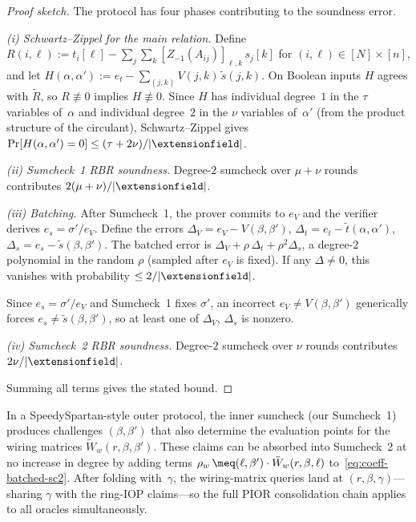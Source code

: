 \begin{proof}[Proof sketch]
The protocol has four phases contributing to the soundness error.

\emph{(i) Schwartz--Zippel for the main relation.}
Define $R(i,\ell) := t_i[\ell] - \sum_j \sum_k
[Z_{-1}(A_{ij})]_{\ell,k}\, s_j[k]$ for $(i,\ell) \in [N] \times [n]$,
and let
$H(\alpha,\alpha') := e_t - \sum_{(j,k)} V(j,k)\, \tilde{s}(j,k)$.
On Boolean inputs $H$ agrees with $\tilde{R}$, so $R \not\equiv 0$
implies $H \not\equiv 0$.  Since $H$ has individual degree~$1$ in
the $\tau$ variables of~$\alpha$ and individual degree~$2$ in
the $\nu$ variables of~$\alpha'$ (from the product structure of the
circulant), Schwartz--Zippel gives
$\Pr[H(\alpha,\alpha') = 0] \leq (\tau + 2\nu)/|\extensionfield|$.

\emph{(ii) Sumcheck~1 RBR soundness.}
Degree-$2$ sumcheck over $\mu + \nu$ rounds contributes
$2(\mu+\nu)/|\extensionfield|$.

\emph{(iii) Batching.}
After Sumcheck~1, the prover commits to $e_V$ and the verifier
derives $e_s = \sigma'/e_V$.  Define the errors
$\Delta_V = e_V - V(\beta,\beta')$,
$\Delta_t = e_t - \tilde{t}(\alpha,\alpha')$,
$\Delta_s = e_s - \tilde{s}(\beta,\beta')$.
The batched error is $\Delta_V + \rho\,\Delta_t + \rho^2\Delta_s$,
a degree-$2$ polynomial in the random $\rho$ (sampled after $e_V$
is fixed).  If any $\Delta \neq 0$, this vanishes with probability
$\leq 2/|\extensionfield|$.

Since $e_s = \sigma'/e_V$ and Sumcheck~1 fixes $\sigma'$,
an incorrect $e_V \neq V(\beta,\beta')$ generically forces
$e_s \neq \tilde{s}(\beta,\beta')$, so at least one of $\Delta_V$,
$\Delta_s$ is nonzero.

\emph{(iv) Sumcheck~2 RBR soundness.}
Degree-$2$ sumcheck over $\nu$ rounds contributes
$2\nu/|\extensionfield|$.

Summing all terms gives the stated bound.
\end{proof}


In a SpeedySpartan-style outer protocol, the inner sumcheck
(our Sumcheck~1) produces challenges $(\beta,\beta')$ that also
determine the evaluation points for the wiring matrices
$\tilde{W}_w(r,\beta,\beta')$.  These claims can be absorbed into
Sumcheck~2 at no increase in degree by adding terms
$\rho_w\, \meq(\ell,\beta') \cdot \tilde{W}_w(r,\beta,\ell)$
to~\eqref{eq:coeff-batched-sc2}.  After folding with~$\gamma$,
the wiring-matrix queries land at $(r,\beta,\gamma)$---sharing
$\gamma$ with the ring-IOP claims---so the full PIOR consolidation
chain applies to all oracles simultaneously.

